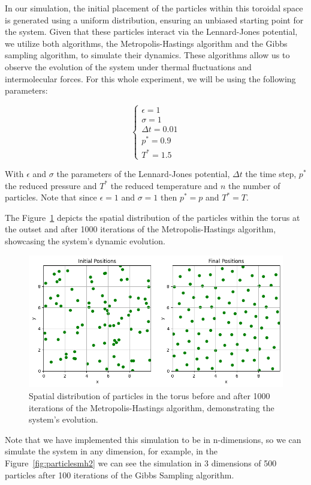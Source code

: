 \documentclass{report}
\begin{document}
In our simulation, the initial placement of the particles within this toroidal space is generated using a uniform distribution, ensuring an unbiased starting point for the system. Given that these particles interact via the Lennard-Jones potential, we utilize both algorithms, the Metropolis-Hastings algorithm and the Gibbs sampling algorithm, to simulate their dynamics. These algorithms allow us to observe the evolution of the system under thermal fluctuations and intermolecular forces. For this whole experiment, we will be using the following parameters:

\[
	\begin{cases}
		\epsilon = 1 \\
		\sigma = 1 \\
		\Delta t = 0.01 \\
		p^{*} = 0.9 \\
		T^{*} = 1.5
	\end{cases}
\]

With \( \epsilon \) and \( \sigma \) the parameters of the Lennard-Jones potential, \( \Delta t \) the time step, \( p^{*} \) the reduced pressure and \( T^{*} \) the reduced temperature and \(n\) the number of particles. Note that since \(\epsilon = 1 \) and \( \sigma = 1\) then \(p^{*} = p\) and \(T^{*} = T\).

The Figure~\ref{fig:particlesmh} depicts the spatial distribution of the particles within the torus at the outset and after 1000 iterations of the Metropolis-Hastings algorithm, showcasing the system's dynamic evolution.

\begin{figure}[H]
	\centering
	\includegraphics[width=0.75\linewidth]{./Figures/MCMC/LennardJones/particles.png}
	\caption{Spatial distribution of particles in the torus before and after 1000 iterations of the Metropolis-Hastings algorithm, demonstrating the system's evolution.}
	\label{fig:particlesmh}
\end{figure}

Note that we have implemented this simulation to be in n-dimensions, so we can simulate the system in any dimension, for example, in the Figure~\ref{fig:particlesmh2} we can see the simulation in 3 dimensions of 500 particles after 100 iterations of the Gibbs Sampling algorithm.
\end{document}
